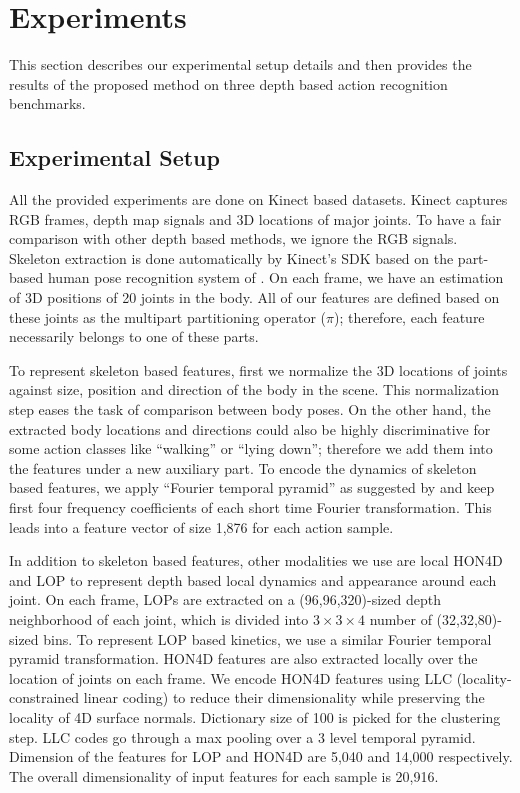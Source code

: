 \documentclass[9pt,technote,compsoc]{IEEEtran}
\begin{document}
\section{Experiments}
This section describes our experimental setup details and then provides the results of the proposed method on three depth based action recognition benchmarks.

\subsection{Experimental Setup}
All the provided experiments are done on Kinect based datasets. Kinect captures RGB frames, depth map signals and 3D locations of major joints. To have a fair comparison with other depth based methods, we ignore the RGB signals. Skeleton extraction is done automatically by Kinect's SDK based on the part-based human pose recognition system of \cite{shotton2011CVPR}. On each frame, we have an estimation of 3D positions of 20 joints in the body. All of our features are defined based on these joints as the multipart partitioning operator ($\pi$); therefore, each feature necessarily belongs to one of these parts.

To represent skeleton based features, first we normalize the 3D locations of joints against size, position and direction of the body in the scene. This normalization step eases the task of comparison between body poses. On the other hand, the extracted body locations and directions could also be highly discriminative for some action classes like ``walking'' or ``lying down''; therefore we add them into the features under a new auxiliary part. To encode the dynamics of skeleton based features, we apply ``Fourier temporal pyramid'' as suggested by \cite{actionletPAMI} and keep first four frequency coefficients of each short time Fourier transformation. This leads into a feature vector of size 1,876 for each action sample.

In addition to skeleton based features, other modalities we use are local HON4D \cite{HON4D} and LOP \cite{actionletPAMI} to represent depth based local dynamics and appearance around each joint. On each frame, LOPs are extracted on a (96,96,320)\--sized depth neighborhood of each joint, which is divided into $3\times3\times4$ number of (32,32,80)\--sized bins. To represent LOP based kinetics, we use a similar Fourier temporal pyramid transformation. HON4D features are also extracted locally over the location of joints on each frame. We encode HON4D features using LLC (locality-constrained linear coding) \cite{LLC} to reduce their dimensionality while preserving the locality of 4D surface normals. Dictionary size of 100 is picked for the clustering step. LLC codes go through a max pooling over a 3 level temporal pyramid. Dimension of the features for LOP and HON4D are 5,040 and 14,000 respectively. The overall dimensionality of input features for each sample is 20,916.
\end{document}
